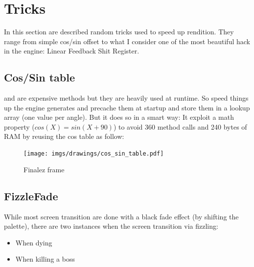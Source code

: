 \section{Tricks}

In this section are described random tricks used to speed up rendition. They range from simple cos/sin offset to what I consider one of the most beautiful hack in the engine: Linear Feedback Shit Register.




\subsection{Cos/Sin table}
 and  are expensive methods but they are heavily used at runtime. So speed things up the engine generates and precache them at startup and store them in a lookup array (one value per angle). But it does so in a smart way: It exploit a math property ($cos(X) = sin(X + 90)$) to avoid 360  method calls and 240 bytes of RAM by reusing the cos table as follow:\\
\par

\begin{minipage}{\textwidth}

\end{minipage}


\begin{figure}[H]
 \centering
  \texttt{[image: imgs/drawings/cos\_sin\_table.pdf]}
 \caption{Finalez frame} 
\end{figure}








\subsection{FizzleFade}
While most screen transition are done with a black fade effect (by shifting the palette), there are two instances
when the screen transition via fizzling:
\begin{itemize}
	\item When dying
	\item When killing a boss
\end{itemize}




\begin{minipage}{\textwidth}
\centering
  \\
  \vspace*{0.5cm}
  \\
\end{minipage}

